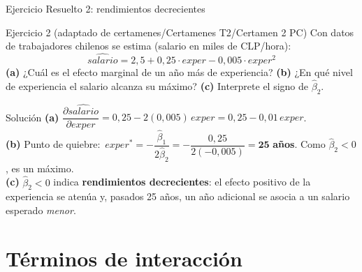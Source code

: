 \documentclass{beamer}
\begin{document}
\begin{frame}{Ejercicio Resuelto 2: rendimientos decrecientes}

\begin{block}{Ejercicio 2 (adaptado de certamenes/Certamenes T2/Certamen 2 PC)}
Con datos de trabajadores chilenos se estima (salario en miles de CLP/hora):
\[
\widehat{salario} = 2{,}5 + 0{,}25\cdot exper - 0{,}005\cdot exper^2
\]
\textbf{(a)} ¿Cuál es el efecto marginal de un año más de experiencia? \quad \textbf{(b)} ¿En qué nivel de experiencia el salario alcanza su máximo? \quad \textbf{(c)} Interprete el signo de $\hat\beta_2$.
\end{block}

\pause

\begin{exampleblock}{Solución}
\textbf{(a)} $\dfrac{\partial \widehat{salario}}{\partial exper} = 0{,}25 - 2(0{,}005)\,exper = 0{,}25 - 0{,}01\,exper$.\\[4pt]
\textbf{(b)} Punto de quiebre: $\,exper^* = -\dfrac{\hat\beta_1}{2\hat\beta_2} = -\dfrac{0{,}25}{2(-0{,}005)} = \mathbf{25}$ \textbf{años}. Como $\hat\beta_2<0$, es un máximo.\\[4pt]
\textbf{(c)} $\hat\beta_2<0$ indica \textbf{rendimientos decrecientes}: el efecto positivo de la experiencia se atenúa y, pasados 25 años, un año adicional se asocia a un salario esperado \emph{menor}.
\end{exampleblock}

\end{frame}

\section{Términos de interacción}
\end{document}
